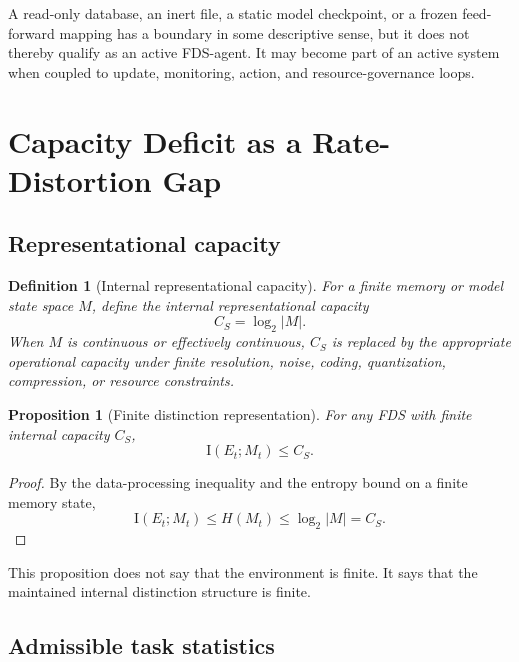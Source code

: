 \documentclass[10pt,a4paper,twocolumn,aps,prl]{revtex4-2}
\newtheorem{definition}{Definition}
\newtheorem{proposition}{Proposition}
\newcommand{\MI}{\mathrm{I}}
\begin{document}
A read-only database, an inert file, a static model checkpoint, or a frozen feed-forward mapping has a boundary in some descriptive sense, but it does not thereby qualify as an active FDS-agent. It may become part of an active system when coupled to update, monitoring, action, and resource-governance loops.

\section{Capacity Deficit as a Rate-Distortion Gap}

\subsection{Representational capacity}

\begin{definition}[Internal representational capacity]
For a finite memory or model state space $M$, define the internal representational capacity
\begin{equation}
C_S=\log_2|M|.
\label{eq:capacity}
\end{equation}
When $M$ is continuous or effectively continuous, $C_S$ is replaced by the appropriate operational capacity under finite resolution, noise, coding, quantization, compression, or resource constraints.
\end{definition}

\begin{proposition}[Finite distinction representation]
For any FDS with finite internal capacity $C_S$,
\begin{equation}
\MI(E_t;M_t)\leq C_S.
\label{eq:finite-representation}
\end{equation}
\end{proposition}

\begin{proof}
By the data-processing inequality and the entropy bound on a finite memory state,
\[
\MI(E_t;M_t)\leq H(M_t)\leq \log_2|M|=C_S.
\]
\end{proof}

This proposition does not say that the environment is finite. It says that the maintained internal distinction structure is finite.

\subsection{Admissible task statistics}
\end{document}
